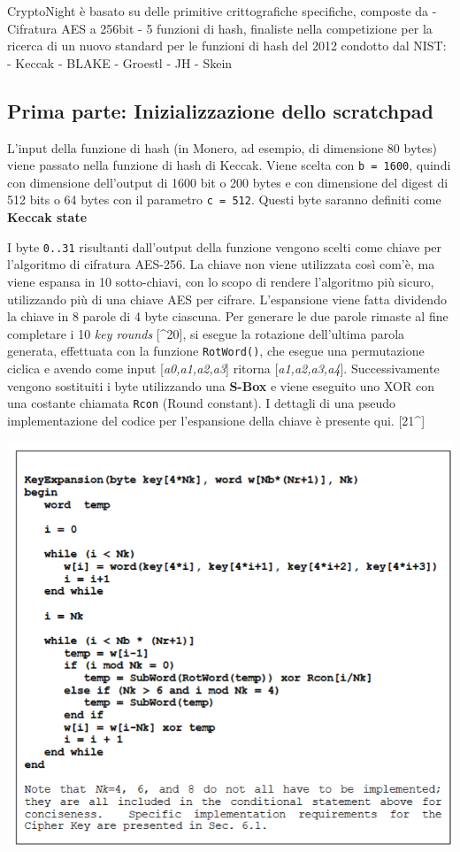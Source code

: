 CryptoNight è basato su delle primitive crittografiche specifiche,
composte da - Cifratura AES a 256bit - 5 funzioni di hash, finaliste
nella competizione per la ricerca di un nuovo standard per le funzioni
di hash del 2012 condotto dal NIST: - Keccak - BLAKE - Groestl - JH -
Skein

\subsection{Prima parte: Inizializzazione dello
scratchpad}\label{prima-parte-inizializzazione-dello-scratchpad}

L'input della funzione di hash (in Monero, ad esempio, di dimensione 80
bytes) viene passato nella funzione di hash di Keccak. Viene scelta con
\texttt{b\ =\ 1600}, quindi con dimensione dell'output di 1600 bit o 200
bytes e con dimensione del digest di 512 bits o 64 bytes con il
parametro \texttt{c\ =\ 512}. Questi byte saranno definiti come
\textbf{Keccak state}

I byte \texttt{0..31} risultanti dall'output della funzione vengono
scelti come chiave per l'algoritmo di cifratura AES-256. La chiave non
viene utilizzata così com'è, ma viene espansa in 10 sotto-chiavi, con lo
scopo di rendere l'algoritmo più sicuro, utilizzando più di una chiave
AES per cifrare. L'espansione viene fatta dividendo la chiave in 8
parole di 4 byte ciascuna. Per generare le due parole rimaste al fine
completare i 10 \emph{key rounds} {[}\^{}20{]}, si esegue la rotazione
dell'ultima parola generata, effettuata con la funzione
\texttt{RotWord()}, che esegue una permutazione ciclica e avendo come
input {[}\emph{a0,a1,a2,a3}{]} ritorna {[}\emph{a1,a2,a3,a4}{]}.
Successivamente vengono sostituiti i byte utilizzando una \textbf{S-Box}
e viene eseguito uno XOR con una costante chiamata \texttt{Rcon} (Round
constant). I dettagli di una pseudo implementazione del codice per
l'espansione della chiave è presente qui. {[}21\^{}{]}

\includegraphics{media/image8.png}

